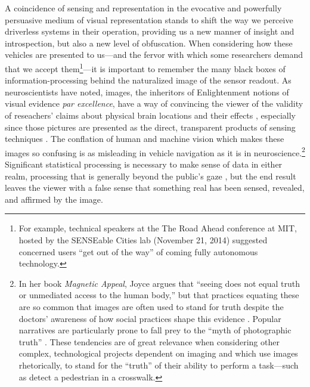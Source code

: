 A coincidence of sensing and representation in the evocative and
powerfully persuasive medium of visual representation stands to shift
the way we perceive driverless systems in their operation, providing
us a new manner of insight and introspection, but also
a new level of obfuscation. When
considering how these vehicles are presented to us---and the fervor with
which some researchers demand that we accept them\footnote{For
  example, technical speakers at the The Road Ahead conference at MIT,
hosted by the SENSEable Cities lab (November 21, 2014) suggested
concerned users ``get out of the way'' of coming fully autonomous
technology.}---it is important to 
remember the many black boxes of information-processing behind the
naturalized image of the sensor readout. As neuroscientists have
noted, images, the inheritors of Enlightenment notions of
visual evidence \emph{par excellence}, have a way of convincing the viewer of
the validity of reseachers' claims about physical brain locations and
their effects \cite{lehrerNeuro}, especially since those pictures are presented as the
direct, transparent products of sensing techniques \cite[p.
  76]{kellyMagnetic}. The conflation of 
human and machine vision which makes these images so confusing is as
misleading in vehicle navigation as it is in neuroscience.\footnote{In
her book \emph{Magnetic Appeal}, Joyce argues that ``seeing does not
equal truth or unmediated access to the human body,'' but that
practices equating these are so common that images are often used to
stand for truth despite the doctors' awareness of how social practices
shape this evidence
\cite[p. 76]{kellyMagnetic}. Popular narratives are particularly prone
to fall
prey to the ``myth of photographic truth'' \cite[p.
  75]{kellyMagnetic}. These tendencies are of great relevance
when considering other complex, technological projects dependent on
imaging and which use images rhetorically, to stand for the ``truth''
of their ability to perform a task---such as detect a pedestrian in a
crosswalk.} Significant 
statistical processing is necessary to make sense of data in either
realm, processing that is generally beyond the public's gaze
\cite{koerthFish}, but the 
end result leaves the viewer with a false sense that something real
has been sensed, revealed, and affirmed by the image.


